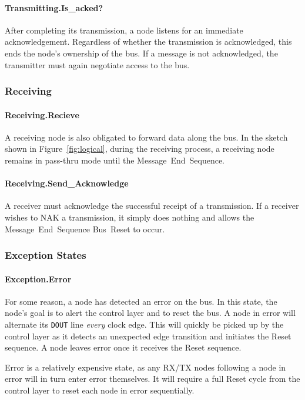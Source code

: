 \paragraph{Transmitting.{\sc Is\_acked?}}
After completing its transmission, a node listens for an immediate
acknowledgement. Regardless of whether the transmission is acknowledged, this
ends the node's ownership of the bus. If a message is not acknowledged, the
transmitter must again negotiate access to the bus.

\subsubsection{Receiving}

\paragraph{Receiving.{\sc Recieve}}
A receiving node is also obligated to forward data along the bus. In the
sketch shown in Figure~\ref{fig:logical}, during the receiving process, a
receiving node remains in pass-thru mode until the Message~End~Sequence.

\paragraph{Receiving.{\sc Send\_Acknowledge}}
A receiver must acknowledge the successful receipt of a transmission. If a
receiver wishes to NAK a transmission, it simply does nothing and allows the
Message~End~Sequence Bus~Reset to occur.

\subsubsection{Exception States}

\paragraph{Exception.{\sc Error}}
For some reason, a node has detected an error on the bus. In this state, the
node's goal is to alert the control layer and to reset the bus. A node in {\sc
error} will alternate its {\tt DOUT} line {\em every} clock edge. This will
quickly be picked up by the control layer as it detects an unexpected edge
transition and initiates the Reset sequence. A node leaves {\sc error} once it
receives the Reset sequence.

{\sc Error} is a relatively expensive state, as any RX/TX nodes following a
node in {\sc error} will in turn enter {\sc error} themselves. It will require
a full Reset cycle from the control layer to reset each node in {\sc error}
sequentially.

